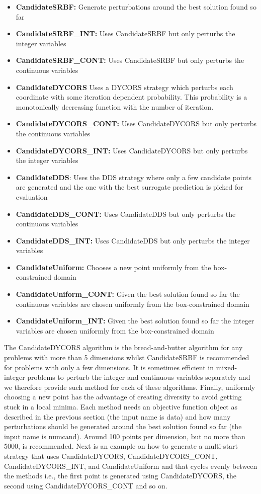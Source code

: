 \documentclass[]{article}
\begin{document}
\begin{itemize}
\item \textbf{CandidateSRBF:} Generate perturbations around the best solution found so far
\item \textbf{CandidateSRBF\_INT:} Uses CandidateSRBF but only perturbs the integer variables
\item \textbf{CandidateSRBF\_CONT:} Uses CandidateSRBF but only perturbs the continuous variables
\item \textbf{CandidateDYCORS} Uses a DYCORS strategy which perturbs each coordinate with some iteration dependent probability. This probability is a monotonically decreasing function with the number of iteration.
\item \textbf{CandidateDYCORS\_CONT:} Uses CandidateDYCORS but only perturbs the continuous variables
\item \textbf{CandidateDYCORS\_INT:} Uses CandidateDYCORS but only perturbs the integer variables
\item \textbf{CandidateDDS}: Uses the DDS strategy where only a few candidate points are generated and the one with the best surrogate prediction is picked for evaluation
\item \textbf{CandidateDDS\_CONT:} Uses CandidateDDS but only perturbs the continuous variables
\item \textbf{CandidateDDS\_INT:} Uses CandidateDDS but only perturbs the integer variables
\item \textbf{CandidateUniform:} Chooses a new point uniformly from the box-constrained domain
\item \textbf{CandidateUniform\_CONT:} Given the best solution found so far the continuous variables are chosen uniformly from the box-constrained domain
\item \textbf{CandidateUniform\_INT:} Given the best solution found so far the integer variables are chosen uniformly from the box-constrained domain
\end{itemize}
The CandidateDYCORS algorithm is the bread-and-butter algorithm for any problems with more than 5 dimensions whilst CandidateSRBF is recommended for problems with only a few dimensions. It is sometimes efficient in mixed-integer problems to perturb the integer and continuous variables separately and we therefore provide such method for each of these algorithms. Finally, uniformly choosing a new point has the advantage of creating diversity to avoid getting stuck in a local minima. Each method needs an objective function object as described in the previous section (the input name is data) and how many perturbations should be generated around the best solution found so far (the input name is numcand). Around 100 points per dimension, but no more than 5000, is recommended. Next is an example on how to generate a multi-start strategy that uses CandidateDYCORS, CandidateDYCORS\_CONT, CandidateDYCORS\_INT, and CandidateUniform and that cycles evenly between the methods i.e., the first point is generated using CandidateDYCORS, the second using CandidateDYCORS\_CONT and so on.
\end{document}
